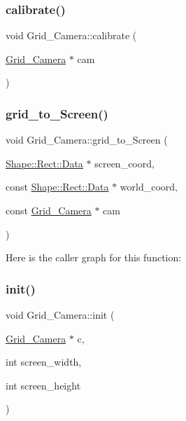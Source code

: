 \subsubsection{\texorpdfstring{calibrate()}{calibrate()}}
{\footnotesize\ttfamily void Grid\+\_\+\+Camera\+::calibrate (\begin{DoxyParamCaption}\item[{\mbox{\hyperlink{struct_grid___camera_1_1_grid___camera}{Grid\+\_\+\+Camera}} $\ast$}]{cam }\end{DoxyParamCaption})}

\mbox{\label{namespace_grid___camera_a081f5cda2f2c730879879bbb0ae895a9}} 
\subsubsection{\texorpdfstring{grid\+\_\+to\+\_\+\+Screen()}{grid\_to\_Screen()}}
{\footnotesize\ttfamily void Grid\+\_\+\+Camera\+::grid\+\_\+to\+\_\+\+Screen (\begin{DoxyParamCaption}\item[{\mbox{\hyperlink{struct_shape_1_1_rect_1_1_data}{Shape\+::\+Rect\+::\+Data}} $\ast$}]{screen\+\_\+coord,  }\item[{const \mbox{\hyperlink{struct_shape_1_1_rect_1_1_data}{Shape\+::\+Rect\+::\+Data}} $\ast$}]{world\+\_\+coord,  }\item[{const \mbox{\hyperlink{struct_grid___camera_1_1_grid___camera}{Grid\+\_\+\+Camera}} $\ast$}]{cam }\end{DoxyParamCaption})}

Here is the caller graph for this function\+:
\mbox{\label{namespace_grid___camera_af5f52d39f4bcbd92342e1ffd74883184}} 
\subsubsection{\texorpdfstring{init()}{init()}}
{\footnotesize\ttfamily void Grid\+\_\+\+Camera\+::init (\begin{DoxyParamCaption}\item[{\mbox{\hyperlink{struct_grid___camera_1_1_grid___camera}{Grid\+\_\+\+Camera}} $\ast$}]{c,  }\item[{int}]{screen\+\_\+width,  }\item[{int}]{screen\+\_\+height }\end{DoxyParamCaption})}

